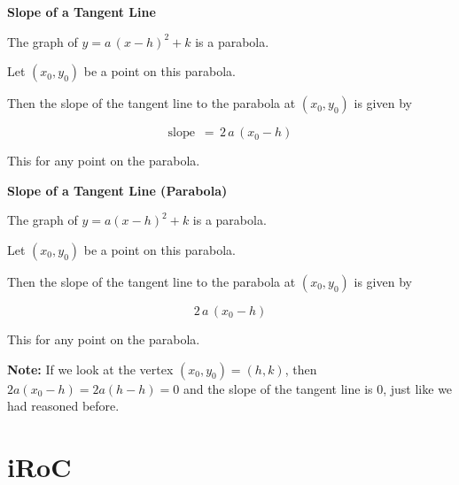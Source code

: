 \documentclass{ximera}
\begin{document}
\begin{conclusion} \textbf{\textcolor{green!50!black}{Slope of a Tangent Line}} 


The graph of $y = a \, (x - h)^2 + k$ is a parabola.

Let $(x_0, y_0)$ be a point on this parabola.

Then the slope of the tangent line to the parabola at $(x_0, y_0)$ is given by 



\[ \text{slope } \, = \, 2 \, a \, (x_0 - h)  \]


\end{conclusion}
This for any point on the parabola.




































\begin{theorem} \textbf{\textcolor{green!50!black}{Slope of a Tangent Line (Parabola)}} 


The graph of $y = a (x - h)^2 + k$ is a parabola.

Let $(x_0, y_0)$ be a point on this parabola.

Then the slope of the tangent line to the parabola at $(x_0, y_0)$ is given by 



\[ 2 \, a \, (x_0 - h) \]


\end{theorem}
This for any point on the parabola.


\textbf{Note:} If we look at the vertex $(x_0, y_0) = (h, k)$, then $2 a (x_0 - h) = 2 a (h - h) = 0$ and the slope of the tangent line is $0$, just like we had reasoned before.





\section*{iRoC}
\end{document}
